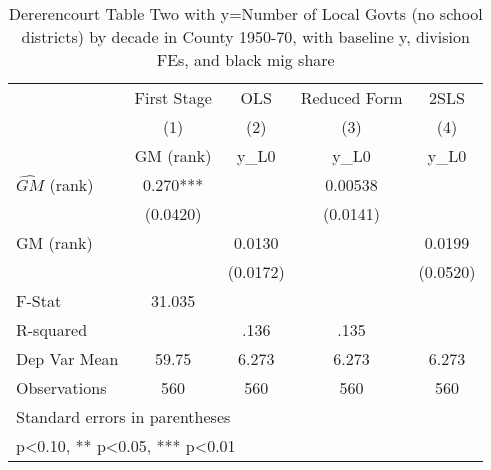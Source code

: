 \begin{table}[htbp]\centering
\def\sym#1{\ifmmode^{#1}\else\(^{#1}\)\fi}
\caption{Dererencourt Table Two with y=Number of Local Govts (no school districts) by decade in County 1950-70, with baseline y, division FEs, and black mig share}
\begin{tabular}{l*{4}{c}}
\toprule
                    & First Stage   &         OLS   &Reduced Form   &        2SLS   \\
                    &\multicolumn{1}{c}{(1)}&\multicolumn{1}{c}{(2)}&\multicolumn{1}{c}{(3)}&\multicolumn{1}{c}{(4)}\\
                    &\multicolumn{1}{c}{GM  (rank)}&\multicolumn{1}{c}{y\_L0}&\multicolumn{1}{c}{y\_L0}&\multicolumn{1}{c}{y\_L0}\\
\midrule
$\hat{GM}$ (rank)   &       0.270***&               &     0.00538   &               \\
                    &    (0.0420)   &               &    (0.0141)   &               \\
\addlinespace
GM  (rank)          &               &      0.0130   &               &      0.0199   \\
                    &               &    (0.0172)   &               &    (0.0520)   \\
\midrule
F-Stat              &      31.035   &               &               &               \\
R-squared           &               &        .136   &        .135   &               \\
Dep Var Mean        &       59.75   &       6.273   &       6.273   &       6.273   \\
Observations        &         560   &         560   &         560   &         560   \\
\bottomrule
\multicolumn{5}{l}{\footnotesize Standard errors in parentheses}\\
\multicolumn{5}{l}{\footnotesize * p<0.10, ** p<0.05, *** p<0.01}\\
\end{tabular}
\end{table}
